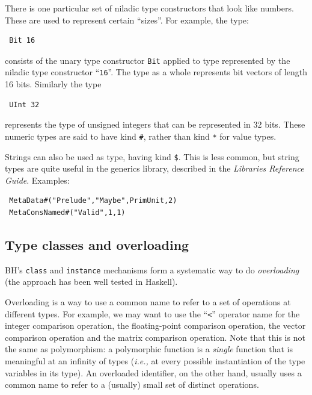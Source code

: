 \documentclass[twoside,letterpaper]{article}
\newcommand{\ie}{\emph{i.e.,}}
\newcommand{\LibRefGuide}{\emph{Libraries Reference Guide}}
\newcommand{\BH}{BH}
\newcommand{\te}[1]{\texttt{#1}}
\newcommand{\qbs}[1]{``\mbox{\te{#1}}''}
\begin{document}
There is one particular set of niladic type constructors that look
like numbers.
These are used to represent certain ``sizes''.  For
example, the type:
\begin{verbatim}
 Bit 16
\end{verbatim}
consists of the unary type constructor {\te{Bit}} applied to type
represented by the niladic type constructor {\qbs{16}}.  The type as a
whole represents bit vectors of length 16 bits.  Similarly the type
\begin{verbatim}
 UInt 32
\end{verbatim}
represents the type of unsigned integers that can be represented in 32
bits.
These numeric types are said to have kind \texttt{\#},
rather than kind \texttt{*} for value types.

Strings can also be used as type, having kind \texttt{\$}.
This is less common, but string types are quite useful in the generics library,
described in the \LibRefGuide.
Examples:
\begin{verbatim}
 MetaData#("Prelude","Maybe",PrimUnit,2)
 MetaConsNamed#("Valid",1,1)
\end{verbatim}


\subsection{Type classes and overloading}

\label{sec-overloading}

{\BH}'s {\te{class}} and {\te{instance}} mechanisms form a
systematic way to do {\emph{overloading}} (the approach has been well
tested in Haskell).

Overloading is a way to use a common name to refer to a set of
operations at different types.  For example, we may want to use the
{\qbs{<}} operator name for the integer comparison operation, the
floating-point comparison operation, the vector comparison operation
and the matrix comparison operation.  Note that this is not the same
as polymorphism: a polymorphic function is a {\emph{single}} function
that is meaningful at an infinity of types ({\ie} at every possible
instantiation of the type variables in its type).  An overloaded
identifier, on the other hand, usually uses a common name to refer to
a (usually) small set of distinct operations.
\end{document}
